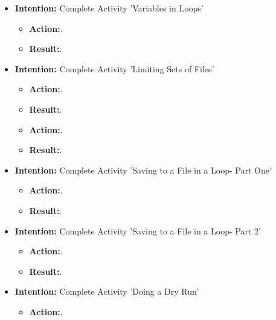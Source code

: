 \documentclass{article}
\begin{document}
\begin{itemize}

\item{\textbf{Intention:} Complete Activity 'Variables in Loops'}

\begin{itemize}
\item{\textbf{Action:}.}

\item{\textbf{Result:}.}

\end{itemize}

\item{\textbf{Intention:} Complete Activity 'Limiting Sets of Files'}

\begin{itemize}
\item{\textbf{Action:}.}

\item{\textbf{Result:}.}

\item{\textbf{Action:}.}

\item{\textbf{Result:}.}


\end{itemize}

\item{\textbf{Intention:} Complete Activity 'Saving to a File in a Loop- Part One'}

\begin{itemize}
\item{\textbf{Action:}.}

\item{\textbf{Result:}.}

\end{itemize}

\item{\textbf{Intention:} Complete Activity 'Saving to a File in a Loop- Part 2'}

\begin{itemize}
\item{\textbf{Action:}.}

\item{\textbf{Result:}.}

\end{itemize}

\item{\textbf{Intention:} Complete Activity 'Doing a Dry Run'}

\begin{itemize}
\item{\textbf{Action:}.}


\end{itemize}
\end{itemize}
\end{document}
